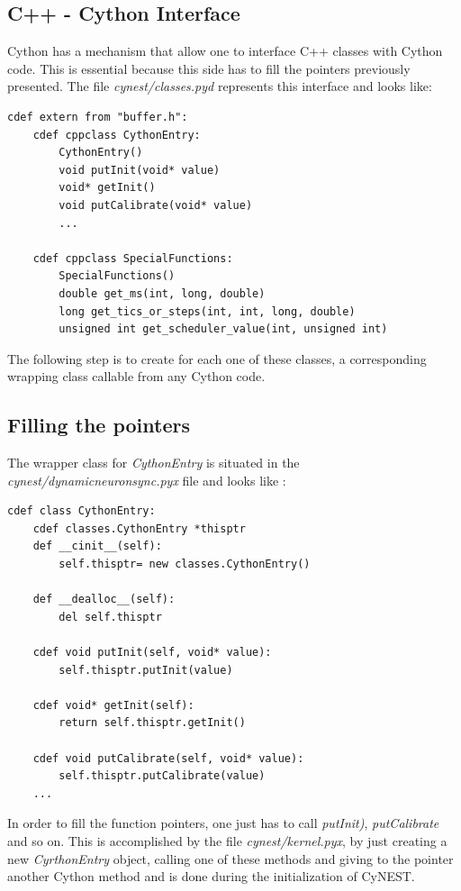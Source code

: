 \documentclass{article}
\begin{document}
\subsection{C++ - Cython Interface}
Cython has a mechanism that allow one to interface C++ classes with Cython code. This is essential because this side has to fill the pointers previously presented.
The file \emph{cynest/classes.pyd} represents this interface and looks like:
\begin{verbatim}
cdef extern from "buffer.h":
    cdef cppclass CythonEntry:
        CythonEntry()
        void putInit(void* value)
        void* getInit()
        void putCalibrate(void* value)
        ...

    cdef cppclass SpecialFunctions:
        SpecialFunctions()
        double get_ms(int, long, double)
        long get_tics_or_steps(int, int, long, double)
        unsigned int get_scheduler_value(int, unsigned int)
\end{verbatim}
The following step is to create for each one of these classes, a corresponding wrapping class callable from any Cython code.
\subsection{Filling the pointers}
The wrapper class for \emph{CythonEntry} is situated in the \emph{cynest/dynamicneuronsync.pyx} file and looks like :
\begin{verbatim}
cdef class CythonEntry:
    cdef classes.CythonEntry *thisptr
    def __cinit__(self):
        self.thisptr= new classes.CythonEntry()
        
    def __dealloc__(self):
        del self.thisptr

    cdef void putInit(self, void* value):
        self.thisptr.putInit(value)
    
    cdef void* getInit(self):
        return self.thisptr.getInit()

    cdef void putCalibrate(self, void* value):
        self.thisptr.putCalibrate(value)
    ...
\end{verbatim}
In order to fill the function pointers, one just has to call \emph{putInit)}, \emph{putCalibrate} and so on. This is accomplished by the file \emph{cynest/kernel.pyx}, by just creating a new \emph{CyrthonEntry} object, calling one of these methods and giving to the pointer another Cython method and is done during the initialization of CyNEST.
\end{document}
